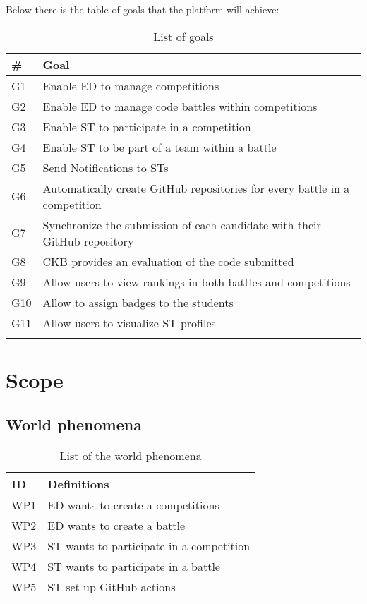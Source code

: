 Below there is the table of goals that the platform will achieve:
\begin{longtable}{|l|l|}
  \hline
  \textbf{\#} & \textbf{Goal}      \\
  \hline
  G1 & Enable ED to manage competitions \\
  \hline
  G2 & Enable ED to manage code battles within competitions \\
  \hline
  G3 & Enable ST to participate in a competition \\
  \hline
  G4 & Enable ST to be part of a team within a battle \\
  \hline
  G5 & Send Notifications to STs   \\
  \hline
  G6 & Automatically create GitHub repositories for every battle in a competition    \\
  \hline
  G7 & Synchronize the submission of each candidate with their GitHub repository   \\
  \hline
  G8 & CKB provides an evaluation of the code submitted    \\
  \hline
  G9 & Allow users to view rankings in both battles and competitions   \\
  \hline
  G10 & Allow to assign badges to the students    \\
  \hline
  G11 & Allow users to visualize ST profiles \\
  \hline
  \caption{List of goals}
  \label{tab:goals}
\end{longtable}

\pagebreak
\section{Scope}
\label{s:Scope}%

\subsection{World phenomena}
\label{ss:world_phenomena}%

\begin{table}[H]
  \begin{tabular}{|l|l|}

    \hline
    \textbf{ID} & \textbf{Definitions}      \\
    \hline
    WP1 & ED wants to create a competitions \\
    \hline
    WP2 & ED wants to create a battle \\
    \hline
    WP3 & ST wants to participate in a competition \\
    \hline
    WP4 & ST wants to participate in a battle     \\
    \hline
    WP5 & ST set up GitHub actions    \\
    \hline
    
  \end{tabular}
  \caption{List of the world phenomena}
  \label{tab:worldPhenomena}
\end{table}

